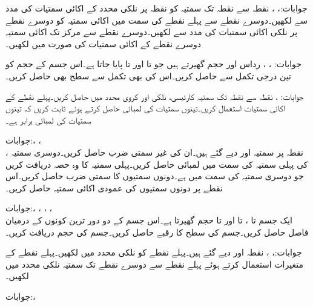 جوابات:، ، 
نقطہ  سے نقطہ  تک سمتیہ کو نقطہ  پر نلکی محدد کے اکائی سمتیات کی مدد سے لکھیں۔دوسرے نقطے سے پہلے نقطے کی سمت میں اکائی سمتیہ کو دوسرے  نقطے پر نلکی اکائی سمتیات کی مدد سے لکھیں۔دوسرے نقطے سے مرکز تک اکائی سمتیہ دوسرے نقطے کے اکائی سمتیات کی صورت  میں لکھیں۔ 

جوابات: ، ،  
رداس  اور  حجم گھیرتے ہیں جو  تا  اور  تا  پایا جاتا ہے۔اس جسم کے حجم کو تین درجی تکمل سے حاصل کریں۔اس کی بھی تکمل سے سطح بھی حاصل کریں۔

جوابات: ، 
نقطہ  سے نقطہ  تک سمتیہ کارتیسی، نلکی اور کروی محدد میں حاصل کریں۔پہلے نقطے کے اکائی سمتیات استعمال کریں۔تینوں سمتیات کی لمبائی حاصل کرتے ہوئے ثابت کریں کہ تینوں سمتیات کی لمبائی برابر ہے۔

جوابات:، ، \\
 ، 
نقطہ  پر سمتیہ  اور  دیے گئے ہیں۔ان کی غیر سمتی ضرب  حاصل کریں۔دوسری سمتیہ کی پہلی سمتیہ کی سمت میں لمبائی حاصل کریں۔پہلی سمتیہ کا وہ حصہ دریافت کریں جو دوسری سمتیہ کی سمت میں ہے۔دونوں سمتیوں کا سمتی ضرب  حاصل کریں۔اس نقطے پر دونوں سمتیوں کی عمودی اکائی سمتیہ حاصل کریں۔

جوابات:، ، ، ،\\ 
ایک جسم  تا ،  تا  اور  تا  حجم گھیرتا ہے۔اس جسم کے دو دور ترین کونوں کے درمیان فاصل حاصل کریں۔جسم کی سطح کا رقبے حاصل کریں۔جسم کی حجم دریافت کریں۔

جوابات:، ، 
نقطہ  اور  دیے گئے ہیں۔پہلے نقطے کو نلکی محدد میں لکھیں۔پہلے نقطے کے متغیرات استعمال کرتے ہوئے پہلے نقطے سے دوسرے نقطے تک سمتیہ نلکی محدد میں لکھیں۔

جوابات:، 
